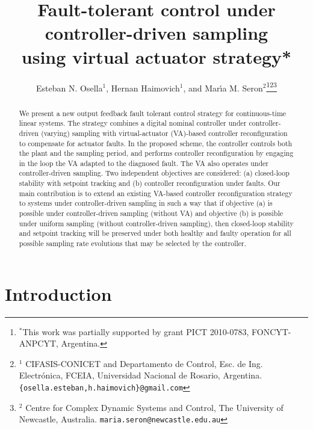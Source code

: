 \documentclass[letterpaper, 10 pt, conference]{ieeeconf}
\title{\LARGE \bf Fault-tolerant control under controller-driven
  sampling\\ using virtual actuator strategy*}
\author{Esteban N. Osella$^{1}$, Hernan Haimovich$^1$, and Mar\'{\i}a M. Seron$^{2}$\thanks{$^*$This work was partially supported by grant PICT 2010-0783, FONCYT-ANPCYT, Argentina.}\thanks{$^{1}$ CIFASIS-CONICET and Departamento de Control, Esc. de Ing. Electr\'onica, FCEIA, Universidad Nacional de Rosario, Argentina. {\tt\small \{osella.esteban,h.haimovich\}@gmail.com}}\thanks{$^{2}$ Centre for Complex Dynamic Systems and Control, The University of Newcastle, Australia.
 {\tt\small maria.seron@newcastle.edu.au}}}
\begin{document}
\maketitle \thispagestyle{empty} \pagestyle{empty}


\begin{abstract}
  We present a new output feedback fault tolerant control strategy for
  continuous-time linear systems. The strategy combines a digital
  nominal controller under controller-driven (varying) sampling with
  virtual-actuator (VA)-based controller reconfiguration to compensate
  for actuator faults.  In the proposed scheme, the controller
  controls both the plant and the sampling period, and performs
  controller reconfiguration by engaging in the loop the VA adapted to
  the diagnosed fault. The VA also operates under controller-driven
  sampling.  Two independent objectives are considered: (a)
  closed-loop stability with setpoint tracking and (b) controller
  reconfiguration under faults. Our main contribution is to extend an
  existing VA-based controller reconfiguration strategy to systems
  under controller-driven sampling in such a way that if objective (a)
  is possible under controller-driven sampling (without VA) and
  objective (b) is possible under uniform sampling (without
  controller-driven sampling), then closed-loop stability and setpoint
  tracking will be preserved under both healthy and faulty operation
  for all possible sampling rate evolutions that may be selected by
  the controller.
\end{abstract}


\section{Introduction}
\label{sec:intro}
\end{document}
